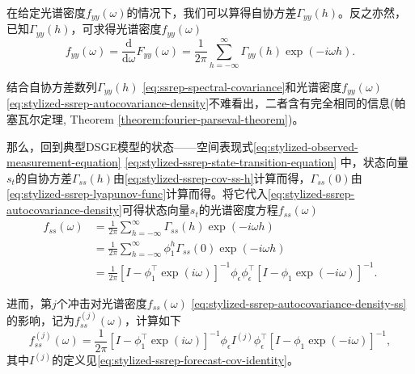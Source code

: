 在给定光谱密度$f_{yy} \left( \omega \right)$的情况下，我们可以算得自协方差$\Gamma_{yy} \left( h \right)$。反之亦然，已知$\Gamma_{yy} \left( h \right)$，可求得光谱密度$f_{yy} \left( \omega \right)$
\begin{equation}
  \label{eq:stylized-ssrep-autocovariance-density}
  f_{yy} \left( \omega \right) = \frac{\mathrm{d}}{\mathrm{d} \omega} F_{yy} \left( \omega \right) = \frac{1}{2 \pi} \sum_{h=-\infty}^{\infty} \Gamma_{yy} \left( h \right) \exp \left( - i \omega h \right).
\end{equation}

结合自协方差数列$\Gamma_{yy} \left( h \right)$ \eqref{eq:ssrep-spectral-covariance}和光谱密度$f_{yy} \left( \omega \right)$ \eqref{eq:stylized-ssrep-autocovariance-density}不难看出，二者含有完全相同的信息(帕塞瓦尔定理, Theorem \ref{theorem:fourier-parseval-theorem})。

那么，回到典型DSGE模型的状态——空间表现式\eqref{eq:stylized-observed-measurement-equation} \eqref{eq:stylized-ssrep-state-transition-equation}
中，状态向量$s_{t}$的自协方差$\Gamma_{ss} \left( h \right)$由\eqref{eq:stylized-ssrep-cov-ss-h}计算而得，$\Gamma_{ss}\left( 0 \right)$由\eqref{eq:stylized-ssrep-lyapunov-func}计算而得。将它代入\eqref{eq:stylized-ssrep-autocovariance-density}可得状态向量$s_{t}$的光谱密度方程$f_{ss} \left( \omega \right)$
\begin{equation}
  \label{eq:stylized-ssrep-autocovariance-density-ss}
  \begin{split}
    f_{ss} \left( \omega \right)
    & = \frac{1}{2\pi} \sum_{h=-\infty}^{\infty} \Gamma_{ss} \left( h \right) \exp \left( - i \omega h \right) \\
    & = \frac{1}{2 \pi} \sum_{h=-\infty}^{\infty} \phi_{1}^{h} \Gamma_{ss} \left( 0 \right) \exp \left( - i \omega h \right) \\
    & = \frac{1}{2 \pi}
    \left[
    I - \phi_{1}^{\top} \exp \left( i \omega \right)
    \right]^{-1}
    \phi_{\epsilon} \phi_{\epsilon}^{\top}
    \left[
    I - \phi_{1} \exp \left( - i \omega \right)
    \right]^{-1}.
  \end{split}
\end{equation}

进而，第$j$个冲击对光谱密度$f_{ss} \left( \omega \right)$ \eqref{eq:stylized-ssrep-autocovariance-density-ss}的影响，记为$f_{ss}^{(j)} \left( \omega \right)$，计算如下
\begin{equation}
  \label{eq:stylized-ssrep-autocovariance-density-ss-j}
  f_{ss}^{(j)} \left( \omega \right) = \frac{1}{2 \pi}
  \left[
  I - \phi_{1}^{\top} \exp \left( i \omega \right)
  \right]^{-1}
  \phi_{\epsilon} I^{(j)} \phi_{\epsilon}^{\top}
  \left[
  I - \phi_{1} \exp \left( - i \omega \right)
  \right]^{-1},
\end{equation}
其中$I^{(j)}$的定义见\eqref{eq:stylized-ssrep-forecast-cov-identity}。

